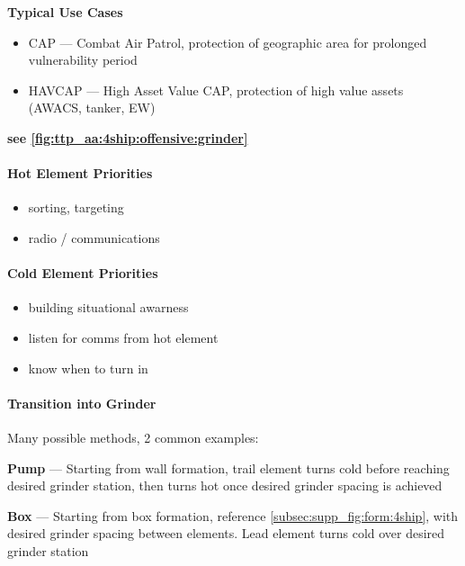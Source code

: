 \textbf{Typical Use Cases} 
\begin{itemize}
    \item CAP --- Combat Air Patrol, protection of geographic area for prolonged vulnerability period
    \item HAVCAP --- High Asset Value CAP, protection of high value assets (AWACS, tanker, EW)
\end{itemize}

\hfill\textbf{see \cref{fig:ttp_aa:4ship:offensive:grinder}}

\paragraph{Hot Element Priorities}
\begin{itemize}
    \item sorting, targeting
    \item radio / communications
\end{itemize}

\paragraph{Cold Element Priorities}
\begin{itemize}
    \item building situational awarness
    \item listen for comms from hot element
    \item know when to turn in
\end{itemize}

\clearpage

\paragraph{Transition into Grinder} Many possible methods, 2 common examples:

\bigskip
\textbf{Pump}
--- Starting from wall formation, trail element turns cold before reaching desired grinder station,
then turns hot once desired grinder spacing is achieved

\textbf{Box}
--- Starting from box formation, 
reference \cref{subsec:supp_fig:form:4ship}, 
with desired grinder spacing between elements.
Lead element turns cold over desired grinder station


